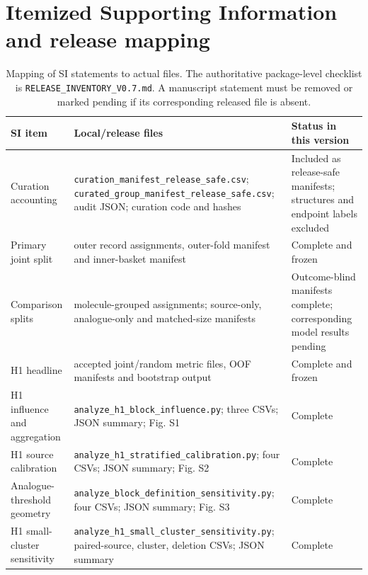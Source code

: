 \documentclass[10pt]{article}
\begin{document}
\section*{Itemized Supporting Information and release mapping}


\begin{table}[htbp]
\centering
\caption{Mapping of SI statements to actual files. The authoritative package-level checklist is \texttt{RELEASE\_\allowbreak{}INVENTORY\_\allowbreak{}V0.7.md}. A manuscript statement must be removed or marked pending if its corresponding released file is absent.}
\scriptsize
\setlength{\tabcolsep}{3pt}
\renewcommand{\arraystretch}{1.15}
\begin{tabularx}{\textwidth}{>{\raggedright\arraybackslash}p{}>{\raggedright\arraybackslash}X>{\raggedright\arraybackslash}p{}}
\toprule
\textbf{SI item} & \textbf{Local/release files} & \textbf{Status in this version} \\
\midrule
Curation accounting & \texttt{curation\_\allowbreak{}manifest\_\allowbreak{}release\_\allowbreak{}safe.csv}; \texttt{curated\_\allowbreak{}group\_\allowbreak{}manifest\_\allowbreak{}release\_\allowbreak{}safe.csv}; audit JSON; curation code and hashes & Included as release-safe manifests; structures and endpoint labels excluded \\
Primary joint split & outer record assignments, outer-fold manifest and inner-basket manifest & Complete and frozen \\
Comparison splits & molecule-grouped assignments; source-only, analogue-only and matched-size manifests & Outcome-blind manifests complete; corresponding model results pending \\
H1 headline & accepted joint/random metric files, OOF manifests and bootstrap output & Complete and frozen \\
H1 influence and aggregation & \texttt{analyze\_\allowbreak{}h1\_\allowbreak{}block\_\allowbreak{}influence.py}; three CSVs; JSON summary; Fig. S1 & Complete \\
H1 source calibration & \texttt{analyze\_\allowbreak{}h1\_\allowbreak{}stratified\_\allowbreak{}calibration.py}; four CSVs; JSON summary; Fig. S2 & Complete \\
Analogue-threshold geometry & \texttt{analyze\_\allowbreak{}block\_\allowbreak{}definition\_\allowbreak{}sensitivity.py}; four CSVs; JSON summary; Fig. S3 & Complete \\
H1 small-cluster sensitivity & \texttt{analyze\_\allowbreak{}h1\_\allowbreak{}small\_\allowbreak{}cluster\_\allowbreak{}sensitivity.py}; paired-source, cluster, deletion CSVs; JSON summary & Complete \\

\end{tabularx}
\end{table}
\end{document}
